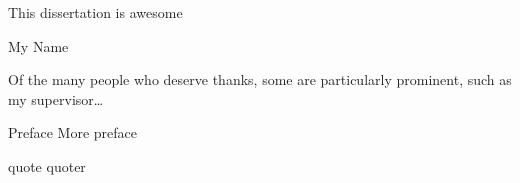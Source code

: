 
\begin{abstract}%
   
\end{abstract}


\begin{declaration}
  This dissertation is awesome
  \vspace*{1cm}
  \begin{flushright}
    My Name
  \end{flushright}
\end{declaration}


\begin{acknowledgements}
  Of the many people who deserve thanks, some are particularly prominent,
  such as my supervisor\dots
\end{acknowledgements}


\begin{preface}
 Preface
  \noindent
 More preface
\end{preface}

\dedication{To me...}

\tableofcontents

\frontquote%
  {quote}%
  {quoter}



